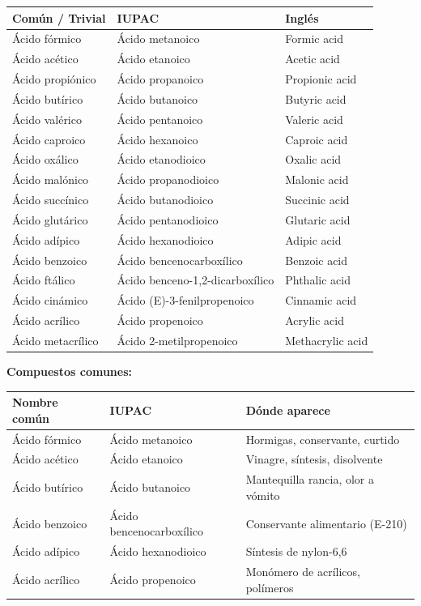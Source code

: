 \begin{longtable}{L{5.0cm} L{7.5cm} L{5.0cm}}
\toprule
\textbf{Común / Trivial} & \textbf{IUPAC} & \textbf{Inglés} \\
\midrule\endhead\bottomrule\endlastfoot
Ácido fórmico    & Ácido metanoico     & Formic acid \\
Ácido acético    & Ácido etanoico      & Acetic acid \\
Ácido propiónico & Ácido propanoico    & Propionic acid \\
Ácido butírico   & Ácido butanoico     & Butyric acid \\
Ácido valérico   & Ácido pentanoico    & Valeric acid \\
Ácido caproico   & Ácido hexanoico     & Caproic acid \\
\midrule{}
Ácido oxálico    & Ácido etanodioico   & Oxalic acid \\
Ácido malónico   & Ácido propanodioico & Malonic acid \\
Ácido succínico  & Ácido butanodioico  & Succinic acid \\
Ácido glutárico  & Ácido pentanodioico & Glutaric acid \\
Ácido adípico    & Ácido hexanodioico  & Adipic acid \\
\midrule{}
Ácido benzoico   & Ácido bencenocarboxílico        & Benzoic acid \\
Ácido ftálico    & Ácido benceno-1,2-dicarboxílico & Phthalic acid \\
Ácido cinámico   & Ácido (E)-3-fenilpropenoico     & Cinnamic acid \\
\midrule{}
Ácido acrílico   & Ácido propenoico        & Acrylic acid \\
Ácido metacrílico & Ácido 2-metilpropenoico & Methacrylic acid \\
\end{longtable}

\textbf{Compuestos comunes:}

\begin{longtable}{L{4.0cm} L{5.5cm} L{8.0cm}}
\toprule
\textbf{Nombre común} & \textbf{IUPAC} & \textbf{Dónde aparece} \\
\midrule\endhead\bottomrule\endlastfoot
Ácido fórmico  & Ácido metanoico          & Hormigas, conservante, curtido \\
Ácido acético  & Ácido etanoico           & Vinagre, síntesis, disolvente \\
Ácido butírico & Ácido butanoico          & Mantequilla rancia, olor a vómito \\
Ácido benzoico & Ácido bencenocarboxílico & Conservante alimentario (E-210) \\
Ácido adípico  & Ácido hexanodioico       & Síntesis de nylon-6,6 \\
Ácido acrílico & Ácido propenoico         & Monómero de acrílicos, polímeros \\
\end{longtable}

